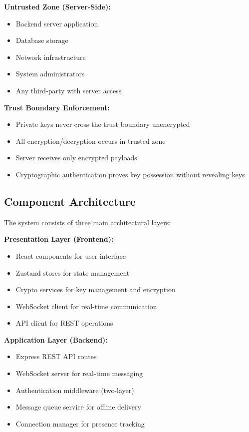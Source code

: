 \textbf{Untrusted Zone (Server-Side):}
\begin{itemize}
    \item Backend server application
    \item Database storage
    \item Network infrastructure
    \item System administrators
    \item Any third-party with server access
\end{itemize}

\textbf{Trust Boundary Enforcement:}
\begin{itemize}
    \item Private keys never cross the trust boundary unencrypted
    \item All encryption/decryption occurs in trusted zone
    \item Server receives only encrypted payloads
    \item Cryptographic authentication proves key possession without revealing keys
\end{itemize}

\subsection{Component Architecture}

The system consists of three main architectural layers:

\textbf{Presentation Layer (Frontend):}
\begin{itemize}
    \item React components for user interface
    \item Zustand stores for state management
    \item Crypto services for key management and encryption
    \item WebSocket client for real-time communication
    \item API client for REST operations
\end{itemize}

\textbf{Application Layer (Backend):}
\begin{itemize}
    \item Express REST API routes
    \item WebSocket server for real-time messaging
    \item Authentication middleware (two-layer)
    \item Message queue service for offline delivery
    \item Connection manager for presence tracking
\end{itemize}

